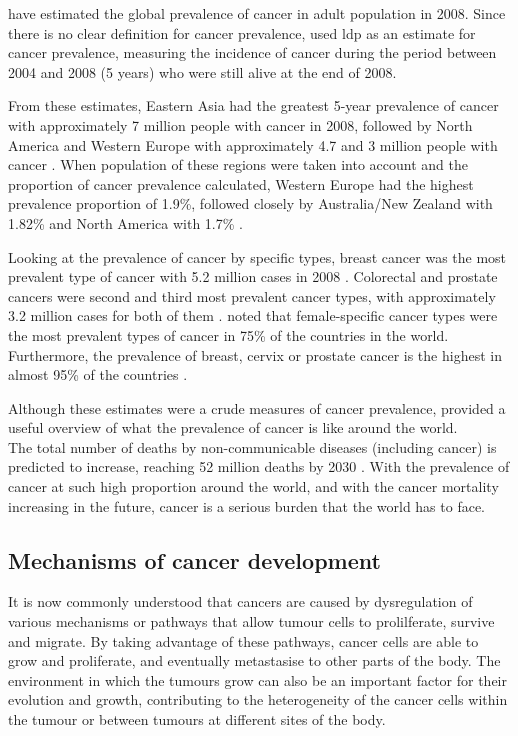 \noindent
\citet{Bray2013} have estimated the global prevalence of cancer in adult population in 2008.
Since there is no clear definition for cancer prevalence, \citet{Bray2013} used \gls{ldp} as an estimate for cancer prevalence, measuring the incidence of cancer during the period between 2004 and 2008 (5 years) who were still alive at the end of 2008.

From these estimates, Eastern Asia had the greatest 5-year prevalence of cancer with approximately 7 million people with cancer in 2008, followed by North America and Western Europe with approximately 4.7 and 3 million people with cancer \citep{Bray2013}.
When population of these regions were taken into account and the proportion of cancer prevalence calculated, Western Europe had the highest prevalence proportion of 1.9\%, followed closely by Australia/New Zealand with 1.82\% and North America with 1.7\% \citep{Bray2013}.

Looking at the prevalence of cancer by specific types, breast cancer was the most prevalent type of cancer with 5.2 million cases in 2008 \citep{Bray2013}.
Colorectal and prostate cancers were second and third most prevalent cancer types, with approximately 3.2 million cases for  both of them \citep{Bray2013}.
\citet{Bray2013} noted that female-specific cancer types were the most prevalent types of cancer in 75\% of the countries in the world.
Furthermore, the prevalence of breast, cervix or prostate cancer is the highest in almost 95\% of the countries \citep{Bray2013}.

Although these estimates were a crude measures of cancer prevalence, \citet{Bray2013} provided a useful overview of what the prevalence of cancer is like around the world.\\

\noindent
The total number of deaths by non-communicable diseases (including cancer) is predicted to increase, reaching 52 million deaths by 2030 \citep{WHO2014}.
With the prevalence of cancer at such high proportion around the world, and with the cancer mortality increasing in the future, cancer is a serious burden that the world has to face.

\subsection{Mechanisms of cancer development}
\label{sub:mechanisms_of_cancer_development}

It is now commonly understood that cancers are caused by dysregulation of various mechanisms or pathways that allow tumour cells to prolilferate, survive and migrate.
By taking advantage of these pathways, cancer cells are able to grow and proliferate, and eventually metastasise to other parts of the body.
The environment in which the tumours grow can also be an important factor for their evolution and growth, contributing to the heterogeneity of the cancer cells within the tumour or between tumours at different sites of the body.

